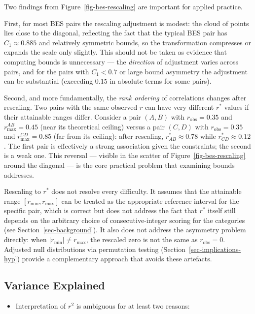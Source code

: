 \documentclass[
  12pt,
]{article}
\providecommand{\tightlist}{%
  \setlength{\itemsep}{0pt}\setlength{\parskip}{0pt}}
\theoremstyle{plain}
\theoremstyle{definition}
\theoremstyle{remark}
\begin{document}
Two findings from Figure~\ref{fig-bes-rescaling} are important for
applied practice.

First, for most BES pairs the rescaling adjustment is modest: the cloud
of points lies close to the diagonal, reflecting the fact that the
typical BES pair has \(C_1 \approx 0.885\) and relatively symmetric
bounds, so the transformation compresses or expands the scale only
slightly. This should not be taken as evidence that computing bounds is
unnecessary --- the \emph{direction} of adjustment varies across pairs,
and for the pairs with \(C_1 < 0.7\) or large bound asymmetry the
adjustment can be substantial (exceeding 0.15 in absolute terms for some
pairs).

Second, and more fundamentally, the \emph{rank ordering} of correlations
changes after rescaling. Two pairs with the same observed \(r\) can have
very different \(r^*\) values if their attainable ranges differ.
Consider a pair \((A, B)\) with \(r_{\text{obs}} = 0.35\) and
\(r_{\max}^{AB} = 0.45\) (near its theoretical ceiling) versus a pair
\((C, D)\) with \(r_{\text{obs}} = 0.35\) and \(r_{\max}^{CD} = 0.85\)
(far from its ceiling): after rescaling, \(r^*_{AB} \approx 0.78\) while
\(r^*_{CD} \approx 0.12\). The first pair is effectively a strong
association given the constraints; the second is a weak one. This
reversal --- visible in the scatter of Figure~\ref{fig-bes-rescaling}
around the diagonal --- is the core practical problem that examining
bounds addresses.

Rescaling to \(r^*\) does not resolve every difficulty. It assumes that
the attainable range \([r_{\min}, r_{\max}]\) can be treated as the
appropriate reference interval for the specific pair, which is correct
but does not address the fact that \(r^*\) itself still depends on the
arbitrary choice of consecutive-integer scoring for the categories (see
Section~\ref{sec-background}). It also does not address the asymmetry
problem directly: when \(|r_{\min}| \neq r_{\max}\), the rescaled zero
is not the same as \(r_{\text{obs}} = 0\). Adjusted null distributions
via permutation testing (Section~\ref{sec-implications-hyp}) provide a
complementary approach that avoids these artefacts.

\subsection{Variance Explained}\label{variance-explained}

\begin{itemize}
\tightlist
\item
  Interpretation of \(r^2\) is ambiguous for at least two reasons:
\end{itemize}
\end{document}
